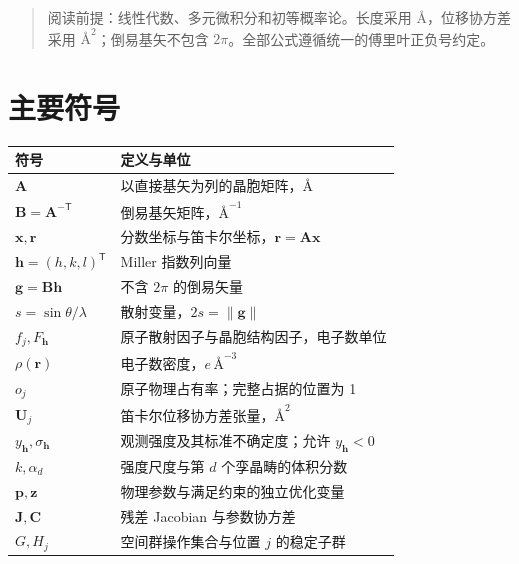 \documentclass[11pt,a4paper,oneside,openany]{book}
\newcommand{\vct}[1]{\bm{#1}}
\newcommand{\mat}[1]{\mathbf{#1}}
\newcommand{\angstrom}{\text{\AA}}
\newenvironment{principle}{\begin{quote}\small\color{ink}}{\end{quote}}
\begin{document}
\begin{principle}
阅读前提：线性代数、多元微积分和初等概率论。长度采用 $\angstrom$，位移协方差采用 $\angstrom^2$；倒易基矢不包含 $2\pi$。全部公式遵循统一的傅里叶正负号约定。
\end{principle}
{\small\tableofcontents}
\chapter*{主要符号}
\begin{longtable}{p{28mm}p{108mm}}
\toprule 符号 & 定义与单位\\\midrule
$\mat A$ & 以直接基矢为列的晶胞矩阵，$\angstrom$\\
$\mat B=\mat A^{-\mathsf T}$ & 倒易基矢矩阵，$\angstrom^{-1}$\\
$\vct x,\vct r$ & 分数坐标与笛卡尔坐标，$\vct r=\mat A\vct x$\\
$\vct h=(h,k,l)^{\mathsf T}$ & Miller 指数列向量\\
$\vct g=\mat B\vct h$ & 不含 $2\pi$ 的倒易矢量\\
$s=\sin\theta/\lambda$ & 散射变量，$2s=\lVert\vct g\rVert$\\
$f_j,F_{\vct h}$ & 原子散射因子与晶胞结构因子，电子数单位\\
$\rho(\vct r)$ & 电子数密度，$e\,\angstrom^{-3}$\\
$o_j$ & 原子物理占有率；完整占据的位置为 1\\
$\mat U_j$ & 笛卡尔位移协方差张量，$\angstrom^2$\\
$y_{\vct h},\sigma_{\vct h}$ & 观测强度及其标准不确定度；允许 $y_{\vct h}<0$\\
$k,\alpha_d$ & 强度尺度与第 $d$ 个孪晶畴的体积分数\\
$\vct p,\vct z$ & 物理参数与满足约束的独立优化变量\\
$\mat J,\mat C$ & 残差 Jacobian 与参数协方差\\
$G,H_j$ & 空间群操作集合与位置 $j$ 的稳定子群\\
\bottomrule
\end{longtable}
\mainmatter












\appendix
{}



\backmatter

\end{document}
